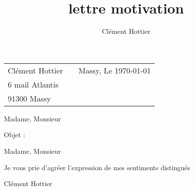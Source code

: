 \documentclass[12pt]{article}
\author{Clément Hottier}
\date{}
\title{lettre motivation}
\begin{document}
\setlength{\parindent}{0pt}
\setlength{\parskip}{8pt}
\pagestyle{empty}


\begin{tabularx}{\linewidth}{@{} l X l @{}}
  Clément Hottier & &Massy, Le \today \\
  6 mail Atlantis & & \\
  91300 Massy & &
\end{tabularx}

\vspace{1cm}
\begin{flushright}
  Madame, Monsieur
\end{flushright}

\vspace{1cm}

Objet : 
\vspace{0.8cm}

Madame, Monsieur 




\vspace{0.5cm}
Je vous prie d'agréer l'expression 
de mes sentiments distingués

\vfill
\hspace{0.63\textwidth} Clément Hottier 
\vfill
\end{document}
